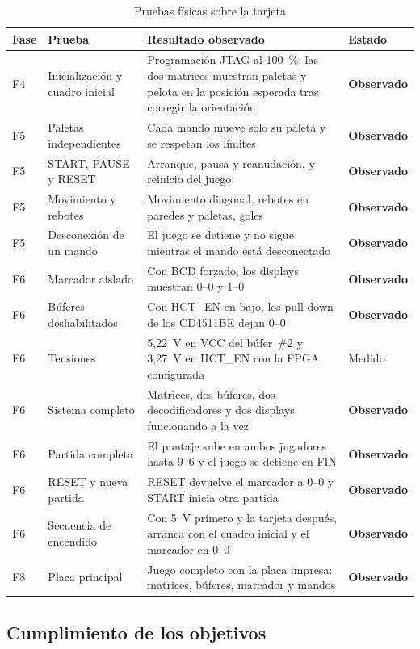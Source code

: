 \documentclass[conference,a4paper]{IEEEtran}
\newcommand{\obs}{\textcolor{green!45!black}{\textbf{Observado}}}
\begin{document}
\begin{table}[!t]
\centering
\caption{Pruebas físicas sobre la tarjeta}
\label{tab:fisicas}
\footnotesize
\begin{tabularx}{\textwidth}{@{}l l Y l@{}}
\toprule
\textbf{Fase} & \textbf{Prueba} & \textbf{Resultado observado} & \textbf{Estado} \\
\midrule
F4 & Inicialización y cuadro inicial & Programación JTAG al 100~\%; las dos matrices muestran paletas y pelota en la posición esperada tras corregir la orientación & \obs \\
F5 & Paletas independientes & Cada mando mueve solo su paleta y se respetan los límites & \obs \\
F5 & START, PAUSE y RESET & Arranque, pausa y reanudación, y reinicio del juego & \obs \\
F5 & Movimiento y rebotes & Movimiento diagonal, rebotes en paredes y paletas, goles & \obs \\
F5 & Desconexión de un mando & El juego se detiene y no sigue mientras el mando está desconectado & \obs \\
F6 & Marcador aislado & Con BCD forzado, los displays muestran 0--0 y 1--0 & \obs \\
F6 & Búferes deshabilitados & Con HCT\_EN en bajo, los pull-down de los CD4511BE dejan 0--0 & \obs \\
F6 & Tensiones & 5,22~V en VCC del búfer~\#2 y 3,27~V en HCT\_EN con la FPGA configurada & Medido \\
F6 & Sistema completo & Matrices, dos búferes, dos decodificadores y dos displays funcionando a la vez & \obs \\
F6 & Partida completa & El puntaje sube en ambos jugadores hasta 9--6 y el juego se detiene en FIN & \obs \\
F6 & RESET y nueva partida & RESET devuelve el marcador a 0--0 y START inicia otra partida & \obs \\
F6 & Secuencia de encendido & Con 5~V primero y la tarjeta después, arranca con el cuadro inicial y el marcador en 0--0 & \obs \\
F8 & Placa principal & Juego completo con la placa impresa: matrices, búferes, marcador y mandos & \obs \\
\bottomrule
\end{tabularx}
\end{table}

\subsection{Cumplimiento de los objetivos}
\end{document}
